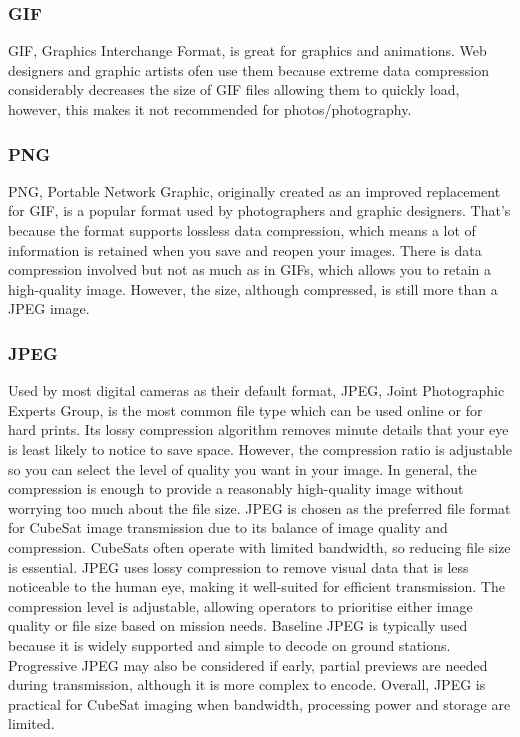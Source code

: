 \documentclass[10pt]{article}
\begin{document}
\begin{multicols}{2}
\subsubsection{GIF}
GIF, Graphics Interchange Format, is great for graphics and animations. Web designers and graphic artists ofen use them because extreme data compression considerably decreases the size of GIF files allowing them to quickly load, however, this makes it not recommended for photos/photography.

\subsubsection{PNG}
PNG, Portable Network Graphic, originally created as an improved replacement for GIF, is a popular format used by photographers and graphic designers. That's because the format supports lossless data compression, which means a lot of information is retained when you save and reopen your images.
\newline \newline 
There is data compression involved but not as much as in GIFs, which allows you to retain a high-quality image. However, the size, although compressed, is still more than a JPEG image.

\subsubsection{JPEG}
Used by most digital cameras as their default format, JPEG, Joint Photographic Experts Group, is the most common file type which can be used online or for hard prints.
Its lossy compression algorithm removes minute details that your eye is least likely to notice to save space. However, the compression ratio is adjustable so you can select the level of quality you want in your image. In general, the compression is enough to provide a reasonably high-quality image without worrying too much about the file size.
\newline \newline 
JPEG is chosen as the preferred file format for CubeSat image transmission due to its balance of image quality and compression.
CubeSats often operate with limited bandwidth, so reducing file size is essential.
JPEG uses lossy compression to remove visual data that is less noticeable to the human eye, making it well-suited for efficient transmission.
The compression level is adjustable, allowing operators to prioritise either image quality or file size based on mission needs.
Baseline JPEG is typically used because it is widely supported and simple to decode on ground stations.
Progressive JPEG may also be considered if early, partial previews are needed during transmission, although it is more complex to encode.
Overall, JPEG is practical for CubeSat imaging when bandwidth, processing power and storage are limited.


\end{multicols}
\end{document}
